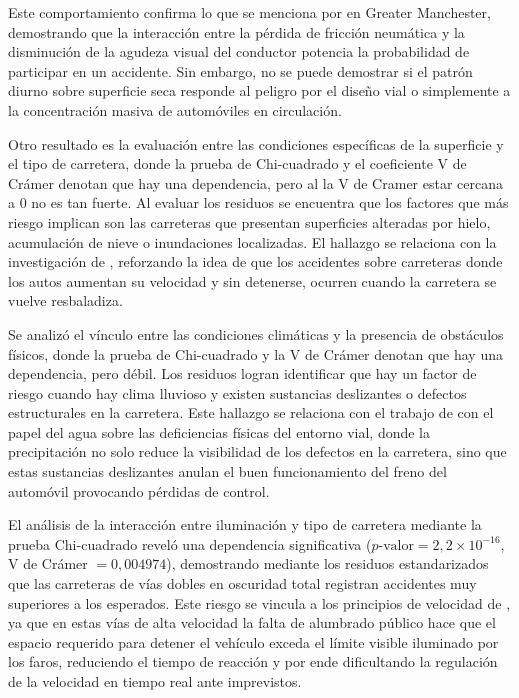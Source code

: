 \documentclass[12pt]{article}
\begin{document}
Este comportamiento confirma lo que se menciona por \textcite{KARZAN2017} en Greater Manchester, demostrando que la interacción entre la pérdida de fricción neumática y la disminución de la agudeza visual del conductor potencia la probabilidad de participar en un accidente. Sin embargo, no se puede demostrar si el patrón diurno sobre superficie seca responde al peligro por el diseño vial o simplemente a la concentración masiva de automóviles en circulación.

Otro resultado es la evaluación entre las condiciones específicas de la superficie y el tipo de carretera, donde la prueba de Chi-cuadrado y el coeficiente V de Crámer denotan que hay una dependencia, pero al la V de Cramer estar cercana a 0 no es tan fuerte. Al evaluar los residuos se encuentra que los factores que más riesgo implican son las carreteras que presentan superficies alteradas por hielo, acumulación de nieve o inundaciones localizadas. El hallazgo se relaciona con la investigación de \textcite{KARZAN2017}, reforzando la idea de que los accidentes sobre carreteras donde los autos aumentan su velocidad y sin detenerse, ocurren cuando la carretera se vuelve resbaladiza.

Se analizó el vínculo entre las condiciones climáticas y la presencia de obstáculos físicos, donde la prueba de Chi-cuadrado y la V de Crámer denotan que hay una dependencia, pero débil. Los residuos logran identificar que hay un factor de riesgo cuando hay clima lluvioso y existen sustancias deslizantes o defectos estructurales en la carretera. Este hallazgo se relaciona con el trabajo de \textcite{KARZAN2017} con el papel del agua sobre las deficiencias físicas del entorno vial, donde la precipitación no solo reduce la visibilidad de los defectos en la carretera, sino que estas sustancias deslizantes anulan el buen funcionamiento del freno del automóvil provocando pérdidas de control.

El análisis de la interacción entre iluminación y tipo de carretera mediante la prueba Chi-cuadrado reveló una dependencia significativa ($p\text{-valor} = 2,2 \times 10^{-16}$, V de Crámer $= 0,004974$), demostrando mediante los residuos estandarizados que las carreteras de vías dobles en oscuridad total registran accidentes muy superiores a los esperados. Este riesgo se vincula a los principios de velocidad de \textcite{TAYLOR2000}, ya que en estas vías de alta velocidad la falta de alumbrado público hace que el espacio requerido para detener el vehículo exceda el límite visible iluminado por los faros, reduciendo el tiempo de reacción y por ende dificultando la regulación de la velocidad en tiempo real ante imprevistos.
\end{document}
